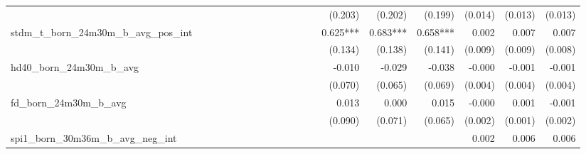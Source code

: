 \begin{tabular}{lrrrrrrrrrrrrrrrrrr}
                                            &              &              &              &              &              &              &              &              &               &              &              &               &      (0.203) &      (0.202) &       (0.199) &      (0.014) &      (0.013) &       (0.013) \\ 
stdm\_t\_born\_24m30m\_b\_avg\_pos\_int     &              &              &              &              &              &              &              &              &               &              &              &               &     0.625*** &     0.683*** &      0.658*** &        0.002 &        0.007 &         0.007 \\ 
                                            &              &              &              &              &              &              &              &              &               &              &              &               &      (0.134) &      (0.138) &       (0.141) &      (0.009) &      (0.009) &       (0.008) \\ 
hd40\_born\_24m30m\_b\_avg                  &              &              &              &              &              &              &              &              &               &              &              &               &       -0.010 &       -0.029 &        -0.038 &       -0.000 &       -0.001 &        -0.001 \\ 
                                            &              &              &              &              &              &              &              &              &               &              &              &               &      (0.070) &      (0.065) &       (0.069) &      (0.004) &      (0.004) &       (0.004) \\ 
fd\_born\_24m30m\_b\_avg                    &              &              &              &              &              &              &              &              &               &              &              &               &        0.013 &        0.000 &         0.015 &       -0.000 &        0.001 &        -0.001 \\ 
                                            &              &              &              &              &              &              &              &              &               &              &              &               &      (0.090) &      (0.071) &       (0.065) &      (0.002) &      (0.001) &       (0.002) \\ 
spi1\_born\_30m36m\_b\_avg\_neg\_int        &              &              &              &              &              &              &              &              &               &              &              &               &              &              &               &        0.002 &        0.006 &         0.006 \\ 

\end{tabular}
